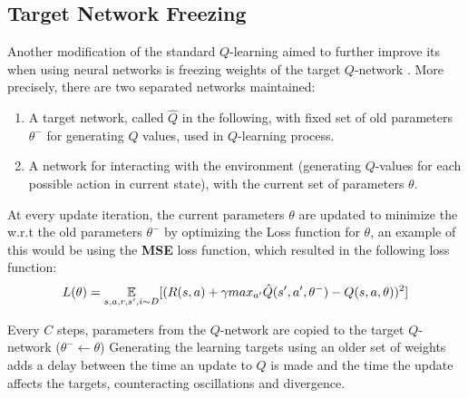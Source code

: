     \subsection{Target Network Freezing}
    Another modification of the standard $Q$-learning aimed to further improve its when using neural networks is freezing weights of the target $Q$-network \cite{mnih2015humanlevel}. More precisely, there are two separated networks maintained:
    \begin{enumerate}
        \item
        A target network, called $\hat{Q}$ in the following, with fixed set of old parameters $\theta^-$ for generating $Q$ values, used in $Q$-learning process.
        \item A network for interacting with the environment (generating $Q$-values for each possible action in current state), with the current set of parameters $\theta$.
    \end{enumerate}
    
        At every update iteration, the current parameters $\theta$ are updated to minimize the w.r.t the old parameters $\theta^-$ by optimizing the Loss function for $\theta$, an example of this would be using the \textbf{MSE} loss function, which resulted in the following loss function:
        \begin{equation}\label{eq:36}
            L(\theta)=\operatorname*{\mathbb{E}}_{s,a,r,s',i \sim D}[(R(s,a)+\gamma max_{a'}\hat{Q}(s',a',\theta^-)-Q(s,a,\theta))^2]
        \end{equation}
        
        
        Every $C$ steps, parameters from the $Q$-network are copied to the target $Q$-network ($\theta^- \gets \theta$)
        Generating the learning targets using an older set of weights adds a delay between the time an update to $Q$ is made and the time the update affects the targets, counteracting oscillations and divergence.
        
